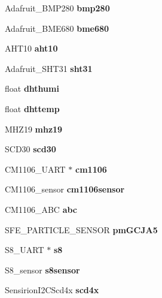 \begin{DoxyCompactItemize}
Adafruit\+\_\+\+B\+M\+P280 {\bfseries bmp280}
\item 
\mbox{\label{classSensors_a9c16019668f5e0e883211d1259331af3}} 
Adafruit\+\_\+\+B\+M\+E680 {\bfseries bme680}
\item 
\mbox{\label{classSensors_a62d8160f55965ccee5a12d9431c1918f}} 
A\+H\+T10 {\bfseries aht10}
\item 
\mbox{\label{classSensors_a8b5bcd2158f4ed4eb1674cc483cfab1d}} 
Adafruit\+\_\+\+S\+H\+T31 {\bfseries sht31}
\item 
\mbox{\label{classSensors_a5edc17132cf264dd930732d04ee6b93b}} 
float {\bfseries dhthumi}
\item 
\mbox{\label{classSensors_a6187794b1329fb68d280df2ee3639e04}} 
float {\bfseries dhttemp}
\item 
\mbox{\label{classSensors_ad6156b78908fd064761301339e54c8af}} 
M\+H\+Z19 {\bfseries mhz19}
\item 
\mbox{\label{classSensors_a23eda1a35572934dab10cfca3635abde}} 
S\+C\+D30 {\bfseries scd30}
\item 
\mbox{\label{classSensors_a3f92336ae7ee535c6417111075949ad1}} 
C\+M1106\+\_\+\+U\+A\+RT $\ast$ {\bfseries cm1106}
\item 
\mbox{\label{classSensors_a8b00eb1d005ea6634307c236d6a39a70}} 
C\+M1106\+\_\+sensor {\bfseries cm1106sensor}
\item 
\mbox{\label{classSensors_ace9ca82dcea1486bdf395cacdb7d2620}} 
C\+M1106\+\_\+\+A\+BC {\bfseries abc}
\item 
\mbox{\label{classSensors_a98fa1dc37540b4c3c11609c7840ada8b}} 
S\+F\+E\+\_\+\+P\+A\+R\+T\+I\+C\+L\+E\+\_\+\+S\+E\+N\+S\+OR {\bfseries pm\+G\+C\+J\+A5}
\item 
\mbox{\label{classSensors_ad5b958024787912f4ab413034a3a0a75}} 
S8\+\_\+\+U\+A\+RT $\ast$ {\bfseries s8}
\item 
\mbox{\label{classSensors_adfac0bef57dc49feb0de18a3a8492ca0}} 
S8\+\_\+sensor {\bfseries s8sensor}
\item 
\mbox{\label{classSensors_a15b986d752487db6a9a61948f255eb84}} 
Sensirion\+I2\+C\+Scd4x {\bfseries scd4x}
\end{DoxyCompactItemize}


